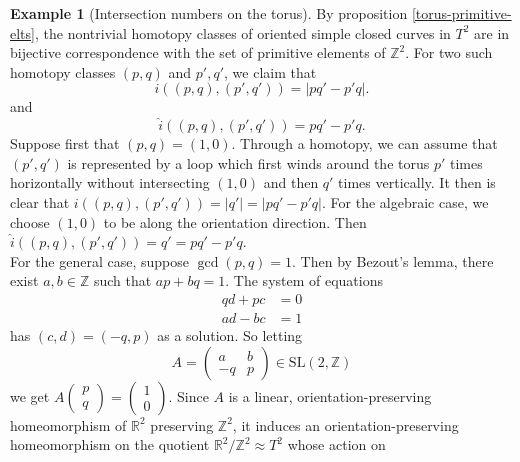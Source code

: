 \documentclass[reqno]{amsart}
\theoremstyle{definition}
\newtheorem{example}[theorem]{Example}
\theoremstyle{remark}
\newcommand{\SL}{{\mathrm{SL}}}
\begin{document}
\begin{example}[Intersection numbers on the
    torus]\label{intersection-numbers-torus}
    By proposition \ref{torus-primitive-elts}, the nontrivial
    homotopy classes of oriented simple closed curves in
    $T^2$ are in bijective correspondence with the
    set of primitive elements of 
    $\mathbb{Z}^2$.
    For two such homotopy classes
    $\left( p,q \right) $ and $p', q'$, we claim that
    \[
    i \left( \left( p,q \right) , \left( p',q' \right)  \right) 
    = \left| pq' - p'q \right| .
    \] 
    and
    \[
    \hat{i}\left( \left( p,q \right) ,
    \left( p',q' \right) \right) 
    = pq' - p'q.
    \] 
    Suppose first that $\left( p,q \right) =(1,0)$. Through a
    homotopy, we can assume that $\left( p',q' \right) $ is
    represented by a loop which first winds around the
    torus $p'$ times horizontally without
    intersecting $(1,0)$ and then $q'$ times vertically. 
    It then is clear that
    $i \left( \left( p,q \right) , \left( p',q' \right)  \right) 
    = \left| q' \right| = \left| pq' - p'q \right| $.
    For the algebraic case, we choose $\left( 1,0 \right) $ 
    to be along the orientation direction. Then
    $\hat{i} \left( \left( p,q \right) , \left( p',q' \right) 
    \right) = q' = pq' - p'q$.\\
    For the general case, suppose
    $\gcd (p,q) = 1$. Then by Bezout's lemma, there
    exist $a,b \in \mathbb{Z}$ such that
    $ap + bq = 1$. The system of equations
    \begin{align*}
        qd + pc &= 0\\
        ad - bc &= 1
    \end{align*}
    has $\left( c,d \right) = \left( -q,p \right) $ as a solution.
    So letting
    \[
    A =
    \begin{pmatrix} a & b \\ -q & p \end{pmatrix} \in 
    \SL \left( 2, \mathbb{Z} \right) 
    \] 
    we get $A \begin{pmatrix} p \\ q \end{pmatrix} 
    = \begin{pmatrix} 1 \\ 0 \end{pmatrix} $.
    Since $A$ is a linear, orientation-preserving
    homeomorphism of $\mathbb{R}^2$ preserving
    $\mathbb{Z}^2$, it induces
    an orientation-preserving homeomorphism
    on the quotient $\mathbb{R}^2 / \mathbb{Z}^2
    \approx T^2$ whose action on

\end{example}
\end{document}
